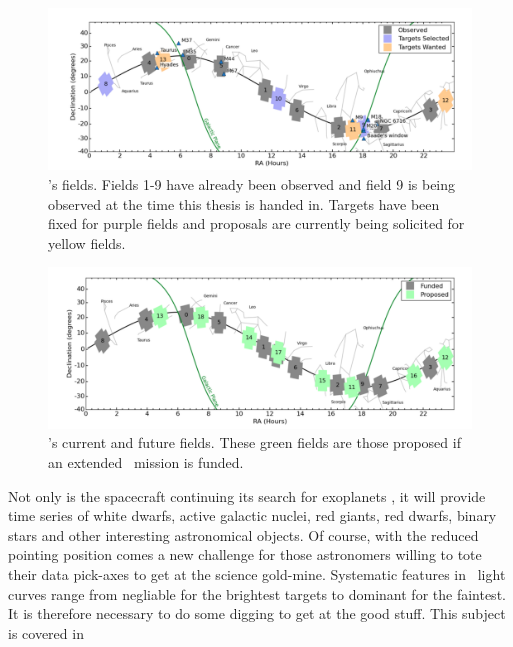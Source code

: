 \begin{figure}[p]
\begin{center}
\includegraphics[width=6in, clip=true]{figures/Current_K2_fields.pdf}
\caption[Current \ktwo\ fields]{\ktwo's fields. Fields 1-9 have already been
observed and field 9 is being observed at the time this thesis is handed in.
Targets have been fixed for purple fields and proposals are currently being
solicited for yellow fields.}
\label{fig:current_fields}
\end{center}
\end{figure}

\begin{figure}[p]
\begin{center}
\includegraphics[width=6in, clip=true]{figures/Future_K2_fields.pdf}
\caption[Future \ktwo\ fields]{\ktwo's current and future fields. These green
fields are those proposed if an extended \ktwo\ mission is funded.}
\label{fig:future_fields}
\end{center}
\end{figure}

Not only is the spacecraft continuing its search for exoplanets \citep[and has
already discovered many, \eg][]{Vanderburg2015, Crossfield2015,
Foreman-Mackey2015, Montet2015, Becker2015, Vanderburg2016}, it will
provide time series of white dwarfs, active galactic nuclei, red giants, red
dwarfs, binary stars and other interesting astronomical objects.
Of course, with the reduced pointing position comes a new challenge for
those astronomers willing to tote their data pick-axes to get at the science
gold-mine.
Systematic features in \ktwo\ light curves range from negliable for the
brightest targets to dominant for the faintest.
It is therefore necessary to do some digging to get at the good stuff.
This subject is covered in 

